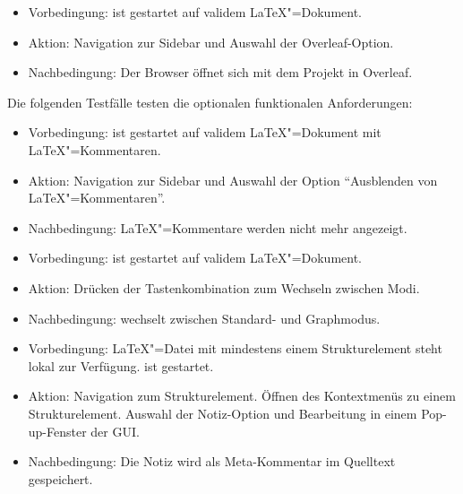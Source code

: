\begin{itemize}
  \item Vorbedingung: \texla{} ist gestartet auf validem \LaTeX"=Dokument.
  \item Aktion: Navigation zur Sidebar und Auswahl der Overleaf-Option.
  \item Nachbedingung: Der Browser öffnet sich mit dem Projekt in Overleaf.
\end{itemize}

Die folgenden Testfälle testen die optionalen funktionalen Anforderungen:

\begin{itemize}
  \item Vorbedingung: \texla{} ist gestartet auf validem \LaTeX"=Dokument mit \LaTeX"=Kommentaren.
  \item Aktion: Navigation zur Sidebar und Auswahl der Option \enquote{Ausblenden von \LaTeX"=Kommentaren}.
  \item Nachbedingung: \LaTeX"=Kommentare werden nicht mehr angezeigt.
\end{itemize}

\begin{itemize}
  \item Vorbedingung: \texla{} ist gestartet auf validem \LaTeX"=Dokument.
  \item Aktion: Drücken der Tastenkombination zum Wechseln zwischen Modi.
  \item Nachbedingung: \texla{} wechselt zwischen Standard- und Graphmodus.
\end{itemize}

\begin{itemize}
  \item Vorbedingung: \LaTeX"=Datei mit mindestens einem Strukturelement steht lokal zur Verfügung.
  \texla{} ist gestartet.
  \item Aktion: Navigation zum Strukturelement.
  Öffnen des Kontextmenüs zu einem Strukturelement.
  Auswahl der Notiz-Option und Bearbeitung in einem Pop-up-Fenster der GUI.
  \item Nachbedingung: Die Notiz wird als Meta-Kommentar im Quelltext gespeichert.
\end{itemize}

